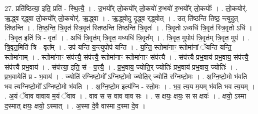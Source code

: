 \documentclass[17pt]{extarticle}
\begin{document}
27. प्रति॑ष्ठित्या॒ इति॒ प्रति॑ - स्थि॒त्यै॒ । . उ॒भयो᳚र् लो॒कयो᳚र् लो॒कयो॑ रु॒भयो॑ रु॒भयो᳚र् लो॒कयोः᳚ । . लो॒कयोर्॑. ऋ॒द्ध्व र्‌द्ध्वा लो॒कयो᳚र् लो॒कयोर्॑. ऋ॒द्ध्वा । . ऋ॒द्ध्वोदु दृ॒द्ध्व र्‌द्ध्वोत् । . उत् ति॑ष्ठन्ति तिष्ठ॒ न्त्युदुत् ति॑ष्ठन्ति । . ति॒ष्ठ॒न्ति॒ त्रि॒वृत॑ स्त्रि॒वृत॑ स्तिष्ठन्ति तिष्ठन्ति त्रि॒वृतः॑ । . त्रि॒वृतो ऽध्यधि॑ त्रि॒वृत॑ स्त्रि॒वृतो ऽधि॑ । . त्रि॒वृत॒ इति॑ त्रि - वृतः॑ । . अधि॑ त्रि॒वृत॑म् त्रि॒वृत॒ मध्यधि॑ त्रि॒वृत᳚म् । . त्रि॒वृत॒ मुपोप॑ त्रि॒वृत॑म् त्रि॒वृत॒ मुप॑ । . त्रि॒वृत॒मिति॑ त्रि - वृत᳚म् । . उप॑ यन्ति य॒न्त्युपोप॑ यन्ति । . य॒न्ति॒ स्तोमा॑नाꣳ॒॒ स्तोमा॑नां ॅयन्ति यन्ति॒ स्तोमा॑नाम् । . स्तोमा॑नाꣳ॒॒ संप॑त्त्यै॒ संप॑त्त्यै॒ स्तोमा॑नाꣳ॒॒ स्तोमा॑नाꣳ॒॒ संप॑त्त्यै । . संप॑त्त्यै प्रभ॒वाय॑ प्रभ॒वाय॒ संप॑त्त्यै॒ संप॑त्त्यै प्रभ॒वाय॑ । . संप॑त्त्या॒ इति॒ सं - प॒त्त्यै॒ । . प्र॒भ॒वाय॒ ज्योति॒र् ज्योतिः॑ प्रभ॒वाय॑ प्रभ॒वाय॒ ज्योतिः॑ । . प्र॒भ॒वायेति॑ प्र - भ॒वाय॑ । . ज्योति॑ रग्निष्टो॒मो᳚ ऽग्निष्टो॒मो ज्योति॒र् ज्योति॑ रग्निष्टो॒मः । . अ॒ग्नि॒ष्टो॒मो भ॑वति भव त्यग्निष्टो॒मो᳚ ऽग्निष्टो॒मो भ॑वति । . अ॒ग्नि॒ष्टो॒म इत्य॑ग्नि - स्तो॒मः । . भ॒व॒ त्य॒य म॒यम् भ॑वति भव त्य॒यम् । . अ॒यं ॅवाव वावाय म॒यं ॅवाव । . वाव स स वाव वाव सः । . स क्षयः॒ क्षयः॒ स स क्षयः॑ । . क्षयो॒ ऽस्मा द॒स्मात् क्षयः॒ क्षयो॒ ऽस्मात् । . अ॒स्मा दे॒वै वास्मा द॒स्मा दे॒व । \newline
\end{document}

